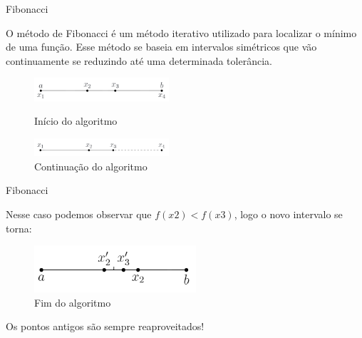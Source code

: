 \begin{frame}[t]{Fibonacci}
	\par O método de Fibonacci é um método iterativo utilizado para localizar o mínimo de uma função. Esse método se baseia em intervalos simétricos que vão continuamente se reduzindo até uma determinada tolerância.
	
	\begin{figure}
		\centering
		\begin{minipage}{0.5\textwidth}
			\centering
			\includegraphics[width=5cm]{./fibonacci_ex1.png}
			\caption{Início do algoritmo}
			\label{}
		\end{minipage}\hfill
		\begin{minipage}{0.5\textwidth}
			\centering
			\includegraphics[width=5cm]{./fibonacci_ex2.png}
			\caption{Continuação do algoritmo}
			\label{}
		\end{minipage}
	\end{figure}
	
	 
\end{frame}

\begin{frame}[t]{Fibonacci}	
	\par Nesse caso podemos observar que $ f(x2)<f(x3) $, logo o novo intervalo se torna:
	
	\begin{figure}[h]
		\begin{center}
			\includegraphics[width=6cm]{./fibonacci_ex3.png}    
			\caption{Fim do algoritmo}
			\label{fig:fibonacci_ex2}
		\end{center}
	\end{figure}
	
	\par Os pontos antigos são sempre reaproveitados!
	
\end{frame}